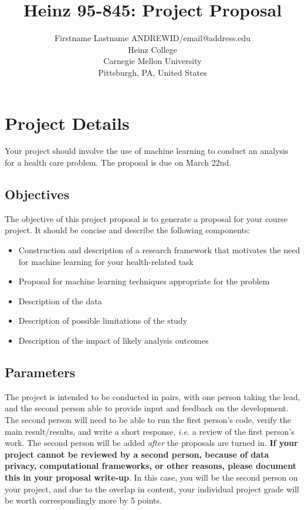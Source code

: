 \documentclass[twoside,11pt]{article}
\begin{document}
\title{Heinz 95-845: Project Proposal}

\author{\name Firstname Lastname \email ANDREWID/email@address.edu \\
       \addr Heinz College\\
       Carnegie Mellon University\\
       Pittsburgh, PA, United States} 

\maketitle


\section{Project Details}
Your project should involve the use of machine learning to conduct an analysis for a health care problem. The proposal is due on March 22nd.

\subsection{Objectives}
The objective of this project proposal is to generate a proposal for your course project. It should be concise and describe the following components:
\begin{itemize}
\item Construction and description of a research framework that motivates the need for machine learning for your health-related task
\item Proposal for machine learning techniques appropriate for the problem
\item Description of the data
\item Description of possible limitations of the study
\item Description of the impact of likely analysis outcomes
\end{itemize}

\subsection{Parameters}
The project is intended to be conducted in pairs, with one person taking the lead, and the second person able to provide input and feedback on the development. The second person will need to be able to run the first person's code, verify the main result/results, and write a short response, \emph{i.e.} a review of the first person's work. The second person will be added \emph{after} the proposals are turned in. \textbf{If your project cannot be reviewed by a second person, because of data privacy, computational frameworks, or other reasons, please document this in your proposal write-up}. In this case, you will be the second person on your project, and due to the overlap in content, your individual project grade will be worth correspondingly more by 5 points.
\end{document}
